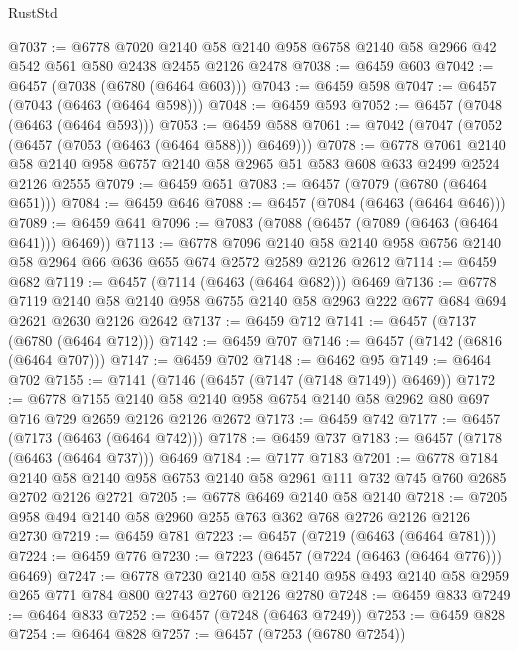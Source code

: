 \begin{lexlean}{RustStd}
\begin{coremodule}
@7037 := @6778
    @7020
    @2140
    @58
    @2140
    @958
    @6758
    @2140
    @58
    @2966
    @42
    @542
    @561
    @580
    @2438
    @2455
    @2126
    @2478
@7038 := @6459 @603
@7042 := @6457 (@7038 (@6780 (@6464 @603)))
@7043 := @6459 @598
@7047 := @6457 (@7043 (@6463 (@6464 @598)))
@7048 := @6459 @593
@7052 := @6457 (@7048 (@6463 (@6464 @593)))
@7053 := @6459 @588
@7061 := @7042 (@7047 (@7052 (@6457 (@7053 (@6463 (@6464 @588))) @6469)))
@7078 := @6778
    @7061
    @2140
    @58
    @2140
    @958
    @6757
    @2140
    @58
    @2965
    @51
    @583
    @608
    @633
    @2499
    @2524
    @2126
    @2555
@7079 := @6459 @651
@7083 := @6457 (@7079 (@6780 (@6464 @651)))
@7084 := @6459 @646
@7088 := @6457 (@7084 (@6463 (@6464 @646)))
@7089 := @6459 @641
@7096 := @7083 (@7088 (@6457 (@7089 (@6463 (@6464 @641))) @6469))
@7113 := @6778
    @7096
    @2140
    @58
    @2140
    @958
    @6756
    @2140
    @58
    @2964
    @66
    @636
    @655
    @674
    @2572
    @2589
    @2126
    @2612
@7114 := @6459 @682
@7119 := @6457 (@7114 (@6463 (@6464 @682))) @6469
@7136 := @6778
    @7119
    @2140
    @58
    @2140
    @958
    @6755
    @2140
    @58
    @2963
    @222
    @677
    @684
    @694
    @2621
    @2630
    @2126
    @2642
@7137 := @6459 @712
@7141 := @6457 (@7137 (@6780 (@6464 @712)))
@7142 := @6459 @707
@7146 := @6457 (@7142 (@6816 (@6464 @707)))
@7147 := @6459 @702
@7148 := @6462 @95
@7149 := @6464 @702
@7155 := @7141 (@7146 (@6457 (@7147 (@7148 @7149)) @6469))
@7172 := @6778
    @7155
    @2140
    @58
    @2140
    @958
    @6754
    @2140
    @58
    @2962
    @80
    @697
    @716
    @729
    @2659
    @2126
    @2126
    @2672
@7173 := @6459 @742
@7177 := @6457 (@7173 (@6463 (@6464 @742)))
@7178 := @6459 @737
@7183 := @6457 (@7178 (@6463 (@6464 @737))) @6469
@7184 := @7177 @7183
@7201 := @6778
    @7184
    @2140
    @58
    @2140
    @958
    @6753
    @2140
    @58
    @2961
    @111
    @732
    @745
    @760
    @2685
    @2702
    @2126
    @2721
@7205 := @6778 @6469 @2140 @58 @2140
@7218 := @7205 @958 @494 @2140 @58 @2960 @255 @763 @362 @768 @2726 @2126 @2126 @2730
@7219 := @6459 @781
@7223 := @6457 (@7219 (@6463 (@6464 @781)))
@7224 := @6459 @776
@7230 := @7223 (@6457 (@7224 (@6463 (@6464 @776))) @6469)
@7247 := @6778
    @7230
    @2140
    @58
    @2140
    @958
    @493
    @2140
    @58
    @2959
    @265
    @771
    @784
    @800
    @2743
    @2760
    @2126
    @2780
@7248 := @6459 @833
@7249 := @6464 @833
@7252 := @6457 (@7248 (@6463 @7249))
@7253 := @6459 @828
@7254 := @6464 @828
@7257 := @6457 (@7253 (@6780 @7254))

\end{coremodule}
\end{lexlean}
